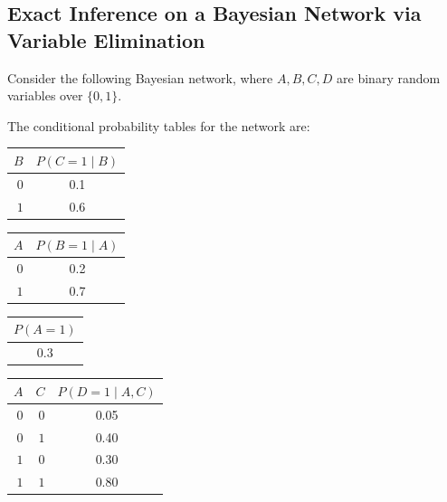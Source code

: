     \clearpage
\subsection{Exact Inference on a Bayesian Network via Variable Elimination}
Consider the following Bayesian network, where $A, B, C, D$ are binary random variables over $\lbrace 0, 1 \rbrace$.
\begin{figure}[H]
  \centering
\end{figure}
\noindent The conditional probability tables for the network are:
\begin{table}[H]
  \centering
    \begin{tabular}{|r|c|}
    \hline
    $B$ & $P(C=1\mid B)$ \\\hline
    $0$ & 0.1 \\\hline
    $1$ & 0.6 \\\hline
  \end{tabular}
  \hspace{1cm}
    \begin{tabular}{|r|c|}
    \hline
    $A$ & $P(B=1\mid A)$ \\\hline
    $0$ & 0.2 \\\hline
    $1$ & 0.7 \\\hline
  \end{tabular}
  \hspace{1cm}
  \begin{tabular}{|c|}
    \hline
    $P(A=1)$ \\\hline
    0.3      \\\hline
  \end{tabular}

\end{table}
\vspace{-1em}
\begin{table}[H]
  \centering
  \hspace{5cm}
  \begin{tabular}{|r|r|c|}
    \hline
    $A$ & $C$ & $P(D=1\mid A,C)$ \\\hline
    $0$ & $0$ & 0.05 \\\hline
    $0$ & $1$ & 0.40 \\\hline
    $1$ & $0$ & 0.30 \\\hline
    $1$ & $1$ & 0.80 \\\hline
  \end{tabular}
\end{table}

